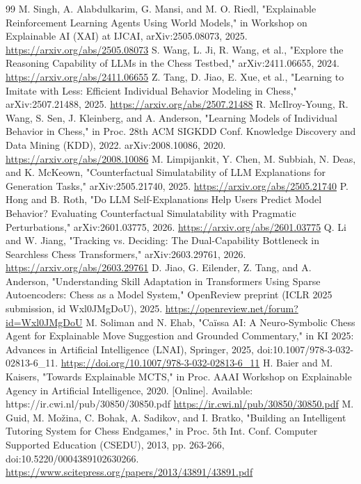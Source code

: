 \documentclass[conference]{IEEEtran}
\begin{document}
\begin{thebibliography}{99}
 M. Singh, A. Alabdulkarim, G. Mansi, and M. O. Riedl, "Explainable Reinforcement Learning Agents Using World Models," in Workshop on Explainable AI (XAI) at IJCAI, arXiv:2505.08073, 2025. \url{https://arxiv.org/abs/2505.08073}
 S. Wang, L. Ji, R. Wang, et al., "Explore the Reasoning Capability of LLMs in the Chess Testbed," arXiv:2411.06655, 2024. \url{https://arxiv.org/abs/2411.06655}
 Z. Tang, D. Jiao, E. Xue, et al., "Learning to Imitate with Less: Efficient Individual Behavior Modeling in Chess," arXiv:2507.21488, 2025. \url{https://arxiv.org/abs/2507.21488}
 R. McIlroy-Young, R. Wang, S. Sen, J. Kleinberg, and A. Anderson, "Learning Models of Individual Behavior in Chess," in Proc. 28th ACM SIGKDD Conf. Knowledge Discovery and Data Mining (KDD), 2022. arXiv:2008.10086, 2020. \url{https://arxiv.org/abs/2008.10086}
 M. Limpijankit, Y. Chen, M. Subbiah, N. Deas, and K. McKeown, "Counterfactual Simulatability of LLM Explanations for Generation Tasks," arXiv:2505.21740, 2025. \url{https://arxiv.org/abs/2505.21740}
 P. Hong and B. Roth, "Do LLM Self-Explanations Help Users Predict Model Behavior? Evaluating Counterfactual Simulatability with Pragmatic Perturbations," arXiv:2601.03775, 2026. \url{https://arxiv.org/abs/2601.03775}
 Q. Li and W. Jiang, "Tracking vs. Deciding: The Dual-Capability Bottleneck in Searchless Chess Transformers," arXiv:2603.29761, 2026. \url{https://arxiv.org/abs/2603.29761}
 D. Jiao, G. Eilender, Z. Tang, and A. Anderson, "Understanding Skill Adaptation in Transformers Using Sparse Autoencoders: Chess as a Model System," OpenReview preprint (ICLR 2025 submission, id Wxl0JMgDoU), 2025. \url{https://openreview.net/forum?id=Wxl0JMgDoU}
 M. Soliman and N. Ehab, "Caïssa AI: A Neuro-Symbolic Chess Agent for Explainable Move Suggestion and Grounded Commentary," in KI 2025: Advances in Artificial Intelligence (LNAI), Springer, 2025, doi:10.1007/978-3-032-02813-6\_11. \url{https://doi.org/10.1007/978-3-032-02813-6_11}
 H. Baier and M. Kaisers, "Towards Explainable MCTS," in Proc. AAAI Workshop on Explainable Agency in Artificial Intelligence, 2020. [Online]. Available: https://ir.cwi.nl/pub/30850/30850.pdf \url{https://ir.cwi.nl/pub/30850/30850.pdf}
 M. Guid, M. Možina, C. Bohak, A. Sadikov, and I. Bratko, "Building an Intelligent Tutoring System for Chess Endgames," in Proc. 5th Int. Conf. Computer Supported Education (CSEDU), 2013, pp. 263-266, doi:10.5220/0004389102630266. \url{https://www.scitepress.org/papers/2013/43891/43891.pdf}

\end{thebibliography}
\end{document}
